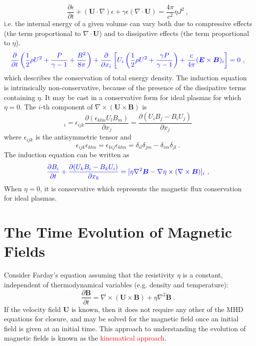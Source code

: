 \documentclass[12pt,a4paper]{article}
\renewcommand{\vec}[1]{\boldsymbol{#1}}
\begin{document}
\begin{equation}
\frac{\partial \epsilon}{\partial t} +(\vec{U}\cdot \nabla)\epsilon +\gamma\epsilon(\nabla \cdot \vec{U}) = \frac{4\pi}{c^2} \eta J^2 ~,
\end{equation}
i.e. the internal energy of a given volume can vary both due to compressive effects (the term proportional to $\nabla \cdot \vec{U}$) and to dissipative effects (the term proportional to $\eta$).
\begin{equation}
\color{blue} \frac{\partial }{\partial t}\left( \frac{1}{2} \rho U^2 +\frac{P}{\gamma-1} +\frac{B^2 }{8\pi}\right) +\frac{\partial }{\partial x_i} \left[U_i\left(\frac{1}{2} \rho U^2 +\frac{\gamma P}{\gamma-1} \right) +\frac{c}{4\pi} (\vec{E} \times \vec{B})_i \right] = 0 ~,
\end{equation}
which describes the conservation of total energy density. The induction equation is intrinsically non-conservative, because of the presence of the dissipative terms containing $\eta$. It may be cast in a conservative form for ideal plasmas for which $\eta = 0$. The $i$-th component of $\nabla \times (\vec{U} \times \vec{B})$ is
\begin{equation*}
[\nabla \times (\vec{U} \times \vec{B}) ]_i = \epsilon_{ijk} \frac{\partial (\epsilon_{klm} U_l B_m)}{\partial x_j} = \frac{\partial (U_i B_j -B_i U_j)}{\partial x_j}
\end{equation*}
where $\epsilon_{ijk}$ is the antisymmetric tensor and 
\begin{equation*}
\epsilon_{ijk}\epsilon_{klm} = \epsilon_{kij} \epsilon_{klm} = \delta_{il} \delta_{jm} - \delta_{im} \delta_{jl} ~.
\end{equation*}
The induction equation can be written as
\begin{equation}
\color{blue} \frac{\partial B_i}{\partial t} +\frac{\partial (U_k B_i -B_k U_i)}{\partial x_k} = [\eta \nabla^2 \vec{B} -\nabla \eta \times (\nabla \times \vec{B})]_i ~,
\end{equation}
When $\eta = 0$, it is conservative which represents the magnetic flux conservation for ideal plasmas.


\section{The Time Evolution of Magnetic Fields}
Consider Farday's equation assuming that the resistivity $\eta$ is a constant, independent of thermodynamical variables (e.g. density and temperature):
\begin{equation}
\frac{\partial \vec{B} }{\partial t} = \nabla \times (\vec{U} \times \vec{B} ) + \eta \nabla^2 \vec{B} ~.
\end{equation}
If the velocity field $\vec{U}$ is known, then it does not require any other of the MHD equations for closure, and may be solved for the magnetic field once an initial field is given at an initial time. This approach to understanding the evolution of magnetic fields is known as the \textcolor{red}{kinematical approach}.
\end{document}
